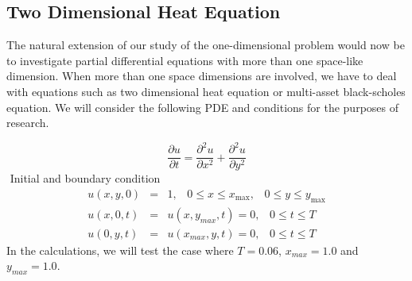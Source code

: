\documentclass[12pt, oneside]{book}
\theoremstyle{plain}
\theoremstyle{definition}
\begin{document}
\subsection{Two Dimensional Heat Equation}
The natural extension of our study of the one-dimensional problem would now be to investigate partial differential equations with more than one space-like dimension. When more than one space dimensions are involved, we have to deal with equations such as two dimensional heat equation or multi-asset black-scholes equation.  We will consider the following PDE and conditions for the purposes of research.

\begin{equation}
\frac{\partial u}{\partial t} = \frac{\partial^2 u}{\partial x^2} +\frac{\partial^2 u}{\partial y^2}
\end{equation}$  $
Initial and boundary condition
\begin{eqnarray} \label{HeatTwoBase}
u(x,y,0) &=& 1, \hspace{10pt} 0 \leq x \leq x_{\max}, \hspace{10pt} 0 \leq y \leq y_{\max} \\[10pt]
u(x, 0, t) &=& u(x, y_{max}, t) = 0, \hspace{10pt} 0 \leq t \leq T \\[10pt]
u(0, y, t) &=& u(x_{max}, y, t) = 0 , \hspace{10pt} 0 \leq t \leq T
\end{eqnarray}
In the calculations, we will test the case where $T = 0.06$, $x_{max} = 1.0$ and $y_{max} = 1.0$.
\end{document}
